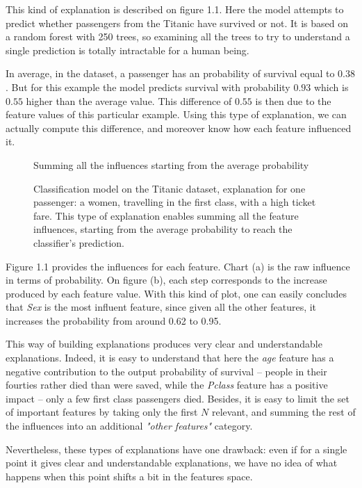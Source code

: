 \documentclass[a4paper,11pt]{kth-mag}
\begin{document}
This kind of explanation is described on figure 1.1. Here the model attempts to predict whether passengers from the Titanic have survived or not. It is based on a random forest with 250 trees, so examining all the trees to try to understand a single prediction is totally intractable for a human being.

In average, in the dataset, a passenger has an probability of survival equal to $0.38$. But for this example the model predicts survival with probability $0.93$ which is $0.55$ higher than the average value. This difference of $0.55$ is then due to the feature values of this particular example. Using this type of explanation, we can actually compute this difference, and moreover know how each feature influenced it. 

\begin{figure}[h!]
		\centering
    	\def\svgwidth{\columnwidth}
    	
    	\caption{Summing all the influences starting from the average probability}
    \caption{Classification model on the Titanic dataset, explanation for one passenger: a women, travelling in the first class, with a high ticket fare. This type of explanation enables summing all the feature influences, starting from the average probability to reach the classifier's prediction.}
\end{figure}

Figure 1.1 provides the influences for each feature. Chart (a) is the raw influence in terms of probability. On figure (b), each step corresponds to the increase produced by each feature value. With this kind of plot, one can easily concludes that \textit{Sex} is the most influent feature, since given all the other features, it increases the probability from around 0.62 to 0.95.

This way of building explanations produces very clear and understandable explanations. Indeed, it is easy to understand that here the \textit{age} feature has a negative contribution to the output probability of survival -- people in their fourties rather died than were saved, while the \textit{Pclass} feature has a positive impact -- only a few first class passengers died. Besides, it is easy to limit the set of important features by taking only the first $N$ relevant, and summing the rest of the influences into an additional \textit{"other features"} category.

Nevertheless, these types of explanations have one drawback: even if for a single point it gives clear and understandable explanations, we have no idea of what happens when this point shifts a bit in the features space.
\end{document}
